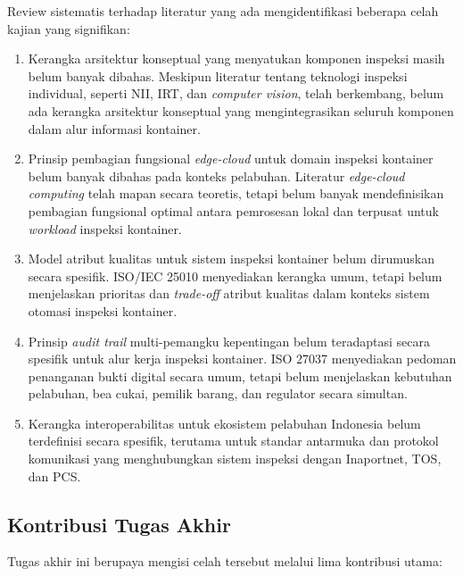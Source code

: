 Review sistematis terhadap literatur yang ada mengidentifikasi beberapa celah
kajian yang signifikan:

\begin{enumerate}
  \item Kerangka arsitektur konseptual yang menyatukan komponen inspeksi masih
  belum banyak
  dibahas. Meskipun literatur tentang teknologi inspeksi individual, seperti
  NII, IRT, dan \textit{computer vision}, telah berkembang, belum ada kerangka
  arsitektur konseptual yang mengintegrasikan seluruh komponen dalam alur
  informasi kontainer.
  \item Prinsip pembagian fungsional \textit{edge-cloud} untuk domain inspeksi
  kontainer belum banyak dibahas pada konteks pelabuhan. Literatur
  \textit{edge-cloud computing} telah mapan secara teoretis, tetapi belum banyak mendefinisikan
  pembagian fungsional optimal antara pemrosesan lokal dan terpusat untuk
  \textit{workload} inspeksi kontainer.
  \item Model atribut kualitas untuk sistem inspeksi kontainer belum dirumuskan
  secara spesifik. ISO/IEC 25010 menyediakan kerangka umum, tetapi belum
  menjelaskan prioritas dan \textit{trade-off} atribut kualitas dalam konteks
  sistem otomasi inspeksi kontainer.
  \item Prinsip \textit{audit trail} multi-pemangku kepentingan belum
  teradaptasi secara spesifik untuk alur kerja inspeksi kontainer. ISO 27037
  menyediakan pedoman penanganan bukti digital secara umum, tetapi belum
  menjelaskan kebutuhan pelabuhan, bea cukai, pemilik barang, dan regulator
  secara simultan.
  \item Kerangka interoperabilitas untuk ekosistem pelabuhan Indonesia belum
  terdefinisi secara spesifik, terutama untuk standar antarmuka dan protokol
  komunikasi yang menghubungkan sistem inspeksi dengan Inaportnet, TOS, dan PCS.
\end{enumerate}

\subsection{Kontribusi Tugas Akhir}

Tugas akhir ini berupaya mengisi celah tersebut melalui lima kontribusi utama:


